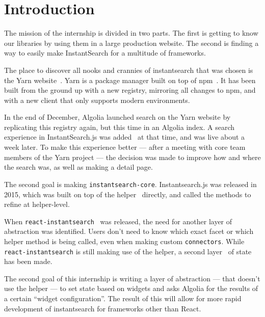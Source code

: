 
\chapter{Introduction} %
\label{chp:introduction}


The mission of the internship is divided in two parts. The first is getting to know our libraries by using them in a large production website. The second is finding a way to easily make InstantSearch for a multitude of frameworks.

The place to discover all nooks and crannies of instantsearch that was chosen is the Yarn website~\cite{yarn-site}. Yarn is a package manager built on top of npm~\cite{npm-github}. It has been built from the ground up with a new registry, mirroring all changes to npm, and with a new client that only supports modern environments.

In the end of December, Algolia launched search on the Yarn website by replicating this registry again, but this time in an Algolia index. A search experience in InstantSearch.js was added~\cite{yarn-pr-add-algolia} at that time, and was live about a week later. To make this experience better --- after a meeting with core team members of the Yarn project --- the decision was made to improve how and where the search was, as well as making a detail page.

The second goal is making {\tt instantsearch-core}. Instantsearch.js was released in 2015, which was built on top of the helper~\cite{algolia-js-helper} directly, and called the methods to refine at helper-level.

When {\tt react-instantsearch}~\cite{react-instantsearch} was released, the need for another layer of abstraction was identified. Users don't need to know which exact facet or which helper method is being called, even when making custom {\tt connectors}\cite{react-instantsearch-connectors}. While {\tt react-instantsearch} is still making use of the helper, a second layer~\cite{react-instantsearch-search-state} of state has been made.

The second goal of this internship is writing a layer of abstraction --- that doesn't use the helper --- to set state based on widgets and asks Algolia for the results of a certain ``widget configuration''. The result of this will allow for more rapid development of instantsearch for frameworks other than React.
